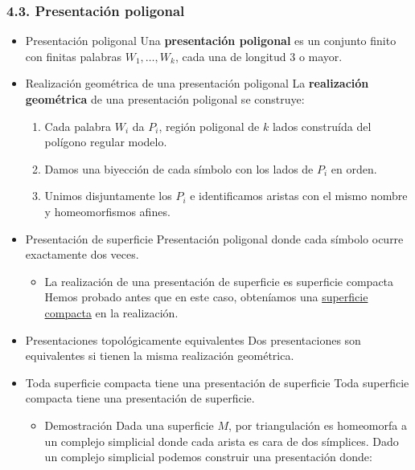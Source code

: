 \documentclass[11pt]{article}
\begin{document}
\subsubsection*{4.3. Presentación poligonal}
\label{sec-1-4-7}
\begin{itemize}
\item Presentación poligonal
\label{sec-1-4-7-1}
Una \textbf{presentación poligonal} es un conjunto finito con finitas palabras
$W_1,\dots,W_k$, cada una de longitud 3 o mayor.

\item Realización geométrica de una presentación poligonal
\label{sec-1-4-7-2}
La \textbf{realización geométrica} de una presentación poligonal se construye:

\begin{enumerate}
\item Cada palabra $W_i$ da $P_i$, región poligonal de $k$ lados construída del
polígono regular modelo.
\item Damos una biyección de cada símbolo con los lados de $P_i$ en orden.
\item Unimos disjuntamente los $P_i$ e identificamos aristas con el mismo
nombre y homeomorfismos afines.
\end{enumerate}

\item Presentación de superficie
\label{sec-1-4-7-3}
Presentación poligonal donde cada símbolo ocurre exactamente dos veces.

\begin{itemize}
\item La realización de una presentación de superficie es superficie compacta
\label{sec-1-4-7-3-1}
Hemos probado antes que en este caso, obteníamos una \hyperref[sec-1-4-5-2]{superficie compacta}
en la realización.
\end{itemize}

\item Presentaciones topológicamente equivalentes
\label{sec-1-4-7-4}
Dos presentaciones son equivalentes si tienen la misma realización 
geométrica.

\item Toda superficie compacta tiene una presentación de superficie
\label{sec-1-4-7-5}
Toda superficie compacta tiene una presentación de superficie.

\begin{itemize}
\item Demostración
\label{sec-1-4-7-5-1}
Dada una superficie $M$, por triangulación es homeomorfa a un complejo
simplicial donde cada arista es cara de dos símplices. Dado un complejo
simplicial podemos construir una presentación donde:


\end{itemize}
\end{itemize}
\end{document}
